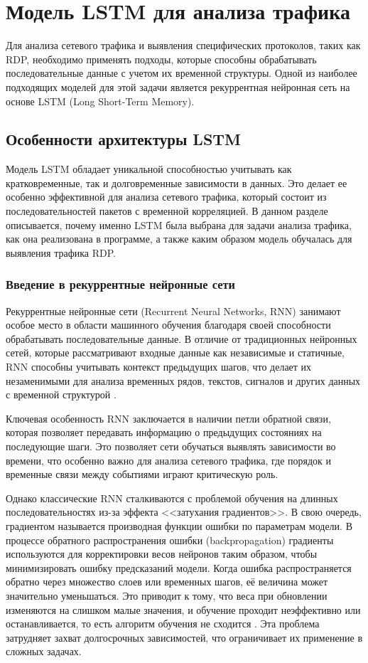 \documentclass[spec, och, diploma]{SCWorks}
\begin{document}
\section{Модель LSTM для анализа трафика}

Для анализа сетевого трафика и выявления специфических протоколов, таких как RDP, необходимо применять подходы, которые способны обрабатывать 
последовательные данные с учетом их временной структуры. Одной из наиболее подходящих моделей для этой задачи является рекуррентная нейронная 
сеть на основе LSTM (Long Short-Term Memory).

\subsection{Особенности архитектуры LSTM}

Модель LSTM обладает уникальной способностью учитывать как кратковременные, так и долговременные зависимости в данных. Это делает ее особенно 
эффективной для анализа сетевого трафика, который состоит из последовательностей пакетов с временной корреляцией. В данном разделе описывается, 
почему именно LSTM была выбрана для задачи анализа трафика, как она реализована в программе, а также каким образом модель обучалась для выявления 
трафика RDP.

  \subsubsection{Введение в рекуррентные нейронные сети}
  Рекуррентные нейронные сети (Recurrent Neural Networks, RNN) занимают особое место в области машинного обучения 
  благодаря своей способности обрабатывать последовательные данные. В отличие от традиционных нейронных сетей, которые 
  рассматривают входные данные как независимые и статичные, RNN способны учитывать контекст предыдущих шагов, что делает их незаменимыми 
  для анализа временных рядов, текстов, сигналов и других данных с временной структурой \cite{nn, nn3}.  

  Ключевая особенность RNN заключается в наличии петли обратной связи, которая позволяет передавать информацию о предыдущих состояниях на последующие 
  шаги. Это позволяет сети обучаться выявлять зависимости во времени, что особенно важно для анализа сетевого трафика, где порядок и временные связи 
  между событиями играют критическую роль.  

  Однако классические RNN сталкиваются с проблемой обучения на длинных последовательностях из-за эффекта <<затухания градиентов>>. В свою очередь, градиентом 
  называется производная функции ошибки по параметрам модели. В процессе обратного распространения ошибки (backpropagation) градиенты используются 
  для корректировки весов нейронов таким образом, чтобы минимизировать ошибку предсказаний модели.
  Когда ошибка распространяется обратно через множество слоев или временных шагов, её величина может значительно уменьшаться. Это приводит к тому, что 
  веса при обновлении изменяются на слишком малые значения, и обучение проходит неэффективно или останавливается, то есть алгоритм обучения не сходится \cite{grad}. 
  Эта проблема затрудняет захват долгосрочных зависимостей, что ограничивает их применение в сложных задачах. 
  
\end{document}
